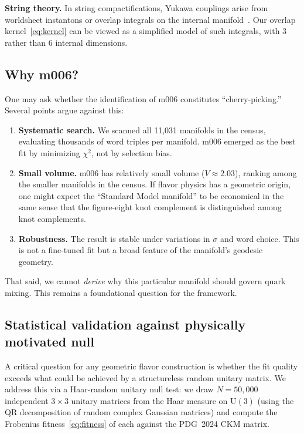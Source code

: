 \documentclass[12pt,prd,superscriptaddress,nofootinbib]{revtex4-2}
\begin{document}
\textbf{String theory.} In string compactifications, Yukawa couplings 
arise from worldsheet instantons or overlap integrals on the internal 
manifold~\cite{Ibanez2012}. Our overlap kernel~\eqref{eq:kernel} can 
be viewed as a simplified model of such integrals, with 3 rather than 
6 internal dimensions.

\subsection{Why m006?}
\label{subsec:why_m006}

One may ask whether the identification of m006 constitutes 
``cherry-picking.'' Several points argue against this:

\begin{enumerate}
\item \textbf{Systematic search.} We scanned all 11,031 manifolds in 
the census, evaluating thousands of word triples per manifold. m006 
emerged as the best fit by minimizing $\chi^2$, not by selection bias.

\item \textbf{Small volume.} m006 has relatively small volume 
($V \approx 2.03$), ranking among the smaller manifolds in the census. 
If flavor physics has a geometric origin, one might expect the 
``Standard Model manifold'' to be economical in the same sense that 
the figure-eight knot complement is distinguished among knot complements.

\item \textbf{Robustness.} The result is stable under variations in 
$\sigma$ and word choice. This is not a fine-tuned fit but a broad 
feature of the manifold's geodesic geometry.
\end{enumerate}

That said, we cannot \emph{derive} why this particular manifold should 
govern quark mixing. This remains a foundational question for the 
framework.


\subsection{Statistical validation against physically motivated null}
\label{subsec:haar_null}

A critical question for any geometric flavor construction is whether
the fit quality exceeds what could be achieved by a structureless
random unitary matrix. We address this via a Haar-random unitary null
test: we draw $N = 50{,}000$ independent $3\times3$ unitary matrices
from the Haar measure on $\mathrm{U}(3)$ (using the QR decomposition
of random complex Gaussian matrices) and compute the Frobenius
fitness~\eqref{eq:fitness} of each against the PDG~2024 CKM matrix.
\end{document}

